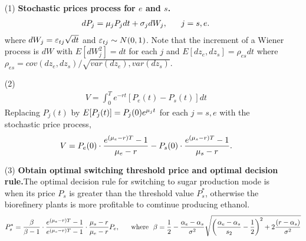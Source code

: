 \documentclass[11pt,letter]{article}
\def\a{\alpha} \def\b{\beta} \def\g{\gamma} \def\d{\delta} \def\r{\rho}
\theoremstyle{definition}
\theoremstyle{remark}
\numberwithin{equation}{section}
\begin{document}
\begin{itemize}
    \item[(1)] \textbf{Stochastic prices process for $e$ and $s$.}
    \begin{align*}
        dP_j=\mu_jP_jdt+\sigma_jdW_j,~~~~~j=s,e.
    \end{align*}
    where $dW_j=\varepsilon_{tj}\sqrt{dt}$ and $\varepsilon_{tj}\sim N(0,1)$. Note that the increment of a Wiener process is $dW$ with $E[dW_j^2]=dt$ for each $j$ and $E[dz_e,dz_s]=\rho_{es}dt$ where $\rho_{es}=cov(dz_e,dz_s)/\sqrt{var(dz_e),var(dz_s)}.$
    
    \item[(2)]
    \begin{align*}
        V=\int_0^Te^{-rt}[P_e(t)-P_s(t)]dt
    \end{align*}
    Replacing $P_j(t)$ by $E[P_j(t)]=P_j(0)e^{\mu_jt}$ for each $j=s,e$ with the stochastic price process,
    \begin{align*}
        V=P_e(0)\cdot\frac{e^{(\mu_e-r)T}-1}{\mu_e-r}-P_s(0)\cdot\frac{e^{(\mu_s-r)T}-1}{\mu_s-r}.
    \end{align*}
    
    \item[(3)] \textbf{Obtain optimal switching threshold price and optimal decision rule.}The optimal decision rule for switching to sugar production mode is when its price $P_s$ is greater than the threshold value $P_s^*$, otherwise the biorefinery plants is more profitable to comtinue producing ethanol.
    \begin{align*}
        P_s^*=\frac{\b}{\b-1}\cdot\frac{e^{(\m_e-r)T}-1}{e^{(\m_s-r)T}-1}\cdot\frac{\m_s-r}{\m_e-r}P_e,
        ~~~~~\text{where}~~\b=\frac{1}{2}-\frac{\a_e-\a_s}{\s^2}\sqrt{\bigg(\frac{\a_e-\a_s}{s_2}-\frac{1}{2}\bigg)^2+2\frac{(r-\a_s)}{\s^2}}
    \end{align*}
\end{itemize}
\end{document}
